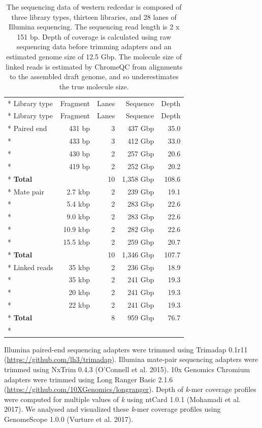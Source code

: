 \documentclass[
  12pt,
  oneside,
  openany]{book}
\begin{document}
\hypertarget{tbl:sequencing}{}
\begin{singlespace}
\small
\begin{longtable}[]{@{}lrrrr@{}}
\caption[The sequencing data of western redcedar is composed of three library types, thirteen libraries, and 28 lanes of Illumina sequencing.]{\label{tbl:sequencing}The sequencing data of western redcedar is composed of three library types, thirteen libraries, and 28 lanes of Illumina sequencing. The sequencing read length is 2 x 151 bp. Depth of coverage is calculated using raw sequencing data before trimming adapters and an estimated genome size of 12.5 Gbp. The molecule size of linked reads is estimated by ChromeQC from alignments to the assembled draft genome, and so underestimates the true molecule size.}\tabularnewline*
\toprule
Library type & Fragment & Lanes & Sequence & Depth\tabularnewline*
\midrule
\endfirsthead
\toprule
Library type & Fragment & Lanes & Sequence & Depth\tabularnewline*
\midrule
\endhead
Paired end & 431 bp & 3 & 437 Gbp & 35.0\tabularnewline*
& 433 bp & 3 & 412 Gbp & 33.0\tabularnewline*
& 430 bp & 2 & 257 Gbp & 20.6\tabularnewline*
& 419 bp & 2 & 252 Gbp & 20.2\tabularnewline*
\textbf{Total} & & 10 & 1,358 Gbp & 108.6\tabularnewline*
Mate pair & 2.7 kbp & 2 & 239 Gbp & 19.1\tabularnewline*
& 5.4 kbp & 2 & 283 Gbp & 22.6\tabularnewline*
& 9.0 kbp & 2 & 283 Gbp & 22.6\tabularnewline*
& 10.9 kbp & 2 & 282 Gbp & 22.6\tabularnewline*
& 15.5 kbp & 2 & 259 Gbp & 20.7\tabularnewline*
\textbf{Total} & & 10 & 1,346 Gbp & 107.7\tabularnewline*
Linked reads & 35 kbp & 2 & 236 Gbp & 18.9\tabularnewline*
& 35 kbp & 2 & 241 Gbp & 19.3\tabularnewline*
& 20 kbp & 2 & 241 Gbp & 19.3\tabularnewline*
& 22 kbp & 2 & 241 Gbp & 19.3\tabularnewline*
\textbf{Total} & & 8 & 959 Gbp & 76.7\tabularnewline*
\bottomrule
\end{longtable}
\end{singlespace}

Illumina paired-end sequencing adapters were trimmed using Trimadap 0.1r11 (\url{https://github.com/lh3/trimadap}). Illumina mate-pair sequencing adapters were trimmed using NxTrim 0.4.3 (O'Connell et al. 2015). 10x Genomics Chromium adapters were trimmed using Long Ranger Basic 2.1.6 (\url{https://github.com/10XGenomics/longranger}). Depth of \emph{k}-mer coverage profiles were computed for multiple values of \emph{k} using ntCard 1.0.1 (Mohamadi et al. 2017). We analysed and visualized these \emph{k}-mer coverage profiles using GenomeScope 1.0.0 (Vurture et al. 2017).
\end{document}
